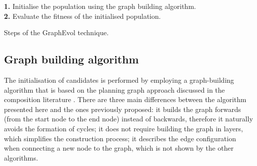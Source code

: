 \documentclass{article}
\begin{document}
\begin{algorithm}
 \setlength{}
 \let\oldnl\nl%
\newcommand{\nonl}{\renewcommand{\nl}{\let\nl\oldnl}}
 \LinesNumbered
	\textbf{1.} Initialise the population using the graph building algorithm.\\
	\textbf{2.} Evaluate the fitness of the initialised population.\\
	\nonl {}
 \caption{\footnotesize Steps of the GraphEvol technique.}
\label{graphEvolSteps}
\end{algorithm}

\subsection{Graph building algorithm}

The initialisation of candidates is performed by employing a graph-building algorithm that is based on
the planning graph approach discussed in the composition literature \cite{huang2009effective,deng2013efficient,wang2013genetic,chen2014qos}.
There are three main differences between the algorithm presented here and the ones previously proposed: it builds the graph forwards (from the start
node to the end node) instead of backwards, therefore it naturally avoids the formation of cycles; it does not require building the graph in layers,
which simplifies the construction process; it describes the edge configuration when connecting a new node to the graph, which is not shown
by the other algorithms.
\end{document}
